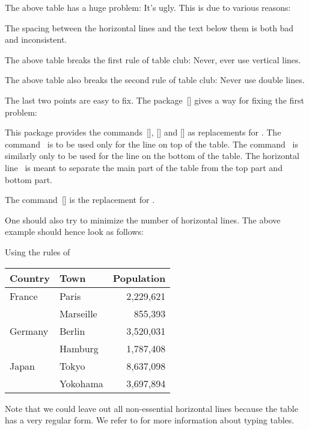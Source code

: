 The above table has a huge problem:
It’s ugly.
This is due to various reasons:
\begin{myitemize}
  \item
    The spacing between the horizontal lines and the text below them is both bad and inconsistent.
  \item
    The above table breaks the first rule of table club:
    Never, ever use vertical lines.
  \item
    The above table also breaks the second rule of table club:
    Never use double lines.
\end{myitemize}
The last two points are easy to fix.
The package~[\packname] gives a way for fixing the first problem:
\begin{myitemize}
  \item
    This package provides the commands~[\comname], [\comname] and [\comname] as replacements for .
    The command~ is to be used only for the line on top of the table.
    The command~ is similarly only to be used for the line on the bottom of the table.
    The horizontal line~ is meant to separate the main part of the table from the top part and bottom part.
  \item
    The command~[\comname] is the replacement for .
\end{myitemize}
One should also try to minimize the number of horizontal lines.
The above example should hence look as follows:
\begin{showlatex}{Using the rules of }
\begin{tabular}{llr}
  \toprule
  \textbf{Country}  &  \textbf{Town}  & \textbf{Population} \\
  \midrule
  France            & Paris           & 2,229,621           \\
  {}                & Marseille       &   855,393           \\
  Germany           & Berlin          & 3,520,031           \\
  {}                & Hamburg         & 1,787,408           \\
  Japan             & Tokyo           & 8,637,098           \\
  {}                & Yokohama        & 3,697,894           \\
  \bottomrule
\end{tabular}
\end{showlatex}

Note that we could leave out all non-essential horizontal lines because the table has a very regular form.
We refer to \cite{booktab} for more information about typing tables.





